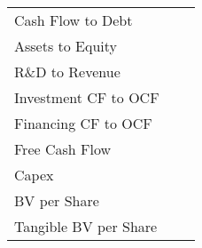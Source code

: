 \documentclass[12pt,a4paper,english]{article}
\begin{document}
\begin{table}[H]
\begin{minipage}{\textwidth}
{\begin{tabular}{lll}
				Cash Flow to Debt                                        &                                                                                                  &                                             \\
				Assets to Equity                                         &                                                                                                  &                                             \\
				R\&D to Revenue                                          &                                                                                                  &                                             \\
				Investment CF to OCF                                     &                                                                                                  &                                             \\
				Financing CF to OCF                                      &                                                                                                  &                                             \\
				Free Cash Flow                                           &                                                                                                  &                                             \\
				Capex                                                    &                                                                                                  &                                             \\
				BV per Share                                             &                                                                                                  &                                             \\
				Tangible BV per Share                                    &                                                                                                  &                                             \\
				\bottomrule
			\end{tabular}%
		}
	\end{minipage}
\end{table}
\end{document}
